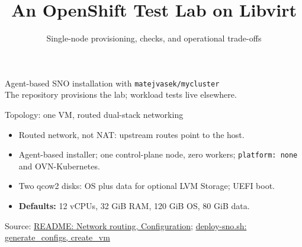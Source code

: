 \documentclass[aspectratio=169,11pt]{beamer}
\title{An OpenShift Test Lab on Libvirt}
\subtitle{Single-node provisioning, checks, and operational trade-offs}
\author{}
\date{}
\newcommand{\reposource}[1]{\par\vfill{\tiny Source: #1\par}}
\newcommand{\readmeref}[1]{\href{https://github.com/matejvasek/mycluster/blob/master/README.md}{README: #1}}
\newcommand{\scriptref}[1]{\href{https://github.com/matejvasek/mycluster/blob/master/deploy-sno.sh}{deploy-sno.sh: #1}}
\begin{document}
\begin{frame}
  \titlepage
  \begin{center}
    \small Agent-based SNO installation with \texttt{matejvasek/mycluster}\\[1mm]
    The repository provisions the lab; workload tests live elsewhere.
  \end{center}
\end{frame}

\begin{frame}{Topology: one VM, routed dual-stack networking}
  \centering
  \begin{itemize}
    \item Routed network, not NAT: upstream routes point to the host.
    \item Agent-based installer; one control-plane node, zero workers;
      \texttt{platform: none} and OVN-Kubernetes.
    \item Two qcow2 disks: OS plus data for optional LVM Storage; UEFI boot.
    \item \textbf{Defaults:} 12 vCPUs, 32 GiB RAM, 120 GiB OS, 80 GiB data.
  \end{itemize}
  \reposource{\readmeref{Network routing, Configuration}; \scriptref{generate\_configs, create\_vm}}
\end{frame}
\end{document}
